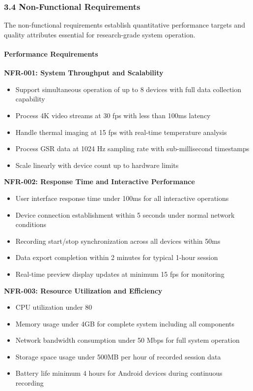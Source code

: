 \documentclass[12pt,a4paper]{report}
\begin{document}
\subsubsection{3.4 Non-Functional Requirements}

The non-functional requirements establish quantitative performance targets and quality attributes essential for
research-grade system operation.

\paragraph{Performance Requirements}

\textbf{NFR-001: System Throughput and Scalability}

\begin{itemize}
\item Support simultaneous operation of up to 8 devices with full data collection capability
\item Process 4K video streams at 30 fps with less than 100ms latency
\item Handle thermal imaging at 15 fps with real-time temperature analysis
\item Process GSR data at 1024 Hz sampling rate with sub-millisecond timestamps
\item Scale linearly with device count up to hardware limits

\end{itemize}
\textbf{NFR-002: Response Time and Interactive Performance}

\begin{itemize}
\item User interface response time under 100ms for all interactive operations
\item Device connection establishment within 5 seconds under normal network conditions
\item Recording start/stop synchronization across all devices within 50ms
\item Data export completion within 2 minutes for typical 1-hour session
\item Real-time preview display updates at minimum 15 fps for monitoring

\end{itemize}
\textbf{NFR-003: Resource Utilization and Efficiency}

\begin{itemize}
\item CPU utilization under 80%
\item Memory usage under 4GB for complete system including all components
\item Network bandwidth consumption under 50 Mbps for full system operation
\item Storage space usage under 500MB per hour of recorded session data
\item Battery life minimum 4 hours for Android devices during continuous recording

\end{itemize}
\end{document}
